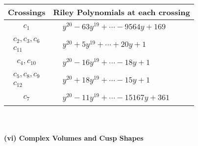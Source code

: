 \documentclass[1p]{elsarticle_modified}
\theoremstyle{definition}
\begin{document}
\begin{tabular}{m{50pt}|m{274pt}}
Crossings & \hspace{64pt}Riley Polynomials at each crossing \\
\hline $$\begin{aligned}c_{1}\end{aligned}$$&$\begin{aligned}
&y^{20}-63 y^{19}+\cdots-9564 y+169
\end{aligned}$\\
\hline $$\begin{aligned}c_{2},c_{3},c_{6}\\c_{11}\end{aligned}$$&$\begin{aligned}
&y^{20}+5 y^{19}+\cdots+20 y+1
\end{aligned}$\\
\hline $$\begin{aligned}c_{4},c_{10}\end{aligned}$$&$\begin{aligned}
&y^{20}-16 y^{19}+\cdots-18 y+1
\end{aligned}$\\
\hline $$\begin{aligned}c_{5},c_{8},c_{9}\\c_{12}\end{aligned}$$&$\begin{aligned}
&y^{20}+18 y^{19}+\cdots-15 y+1
\end{aligned}$\\
\hline $$\begin{aligned}c_{7}\end{aligned}$$&$\begin{aligned}
&y^{20}-11 y^{19}+\cdots-15167 y+361
\end{aligned}$\\
\hline
\end{tabular}\\~\\
\newpage\flushleft \textbf{(vi) Complex Volumes and Cusp Shapes}
\end{document}
